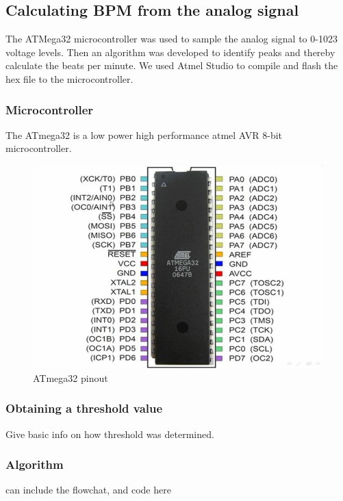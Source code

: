 \documentclass[12pt]{article}
\begin{document}
		\clearpage
	\subsection{Calculating BPM from the analog signal}
	The ATMega32 microcontroller was used to sample the analog signal to 0-1023 voltage levels. Then an algorithm was developed to identify peaks and thereby calculate the beats per minute. We used Atmel Studio to compile and flash the hex file to the microcontroller. 


	\subsubsection{Microcontroller}
	The ATmega32 is a low power high performance atmel AVR 8-bit microcontroller.
			\begin{figure}[!htbp]
				\centering
				\includegraphics[scale = 1]{atmega32.jpg}
				\caption{ATmega32 pinout}
			\end{figure}

	\subsubsection{Obtaining a threshold value}
	\label{sec:4.3.2}

	Give basic info on how threshold was determined.

	\subsubsection{Algorithm}
	can include the flowchat, and code here
\end{document}
